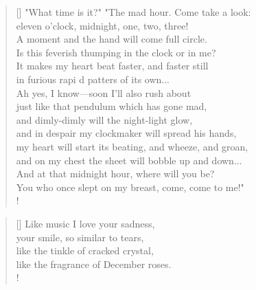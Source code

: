 \documentclass[]{article}
\begin{document}
\settowidth{\versewidth}{"What time is it?" "The mad hour. Come take a look}
\begin{verse}[\versewidth]
"What time is it?" "The mad hour. Come take a look:\\
eleven o'clock, midnight, one, two, three!\\
A moment and the hand will come full circle.\\
Is this feverish thumping in the clock or in me?\\
It makes my heart beat faster, and faster still\\
in furious rapi d patters of its own...\\
Ah yes, I know—soon I'll also rush about\\
just like that pendulum which has gone mad,\\
and dimly-dimly will the night-light glow,\\
and in despair my clockmaker will spread his hands,\\
my heart will start its beating, and wheeze, and groan,\\
and on my chest the sheet will bobble up and down...\\
And at that midnight hour, where will you be?\\
You who once slept on my breast, come, come to me!"\\!
\end{verse}
\biskip \bigskip

\settowidth{\versewidth}{Like music I love your sadness }
\begin{verse}[\versewidth]
Like music I love your sadness,\\
your smile, so similar to tears,\\
like the tinkle of cracked crystal,\\
like the fragrance of December roses.\\!
\end{verse}
\newpage 
\end{document}
